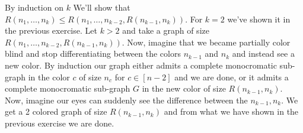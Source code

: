 \documentclass[a4paper,11pt]{exam}
\begin{document}
\begin{enumerate}
	\begin{solution}
		By induction on $k$ We'll show that $R(n_1,\dots,n_k)\leq R(n_1,\dots,n_{k-2},R(n_{k-1},n_k)) $. For $k=2$ we've shown it in the previous exercise.
		Let $k>2$ and take a graph of size $ R(n_1,\dots,n_{k-2},R(n_{k-1},n_k))$. Now, imagine that we became partially color blind and stop differentiating between the colors $n_{k-1}$ and $n_k$ and instead see a new color. By induction our graph either admits a complete monocromatic sub-graph in the color $c$ of size $n_c$ for $c\in [n-2]$ and we are done, or it admits a complete monocromatic sub-graph $ G $ in the new color of size $R(n_{k-1},n_k)$. Now, imagine our eyes can suddenly see the difference between the $n_{k-1},n_k$. We get a 2 colored graph of size $R(n_{k-1},n_k)$ and from what we have shown in the previous exercise we are done.
	\end{solution}
\end{enumerate}
\bigskip
\bigskip
\end{document}
